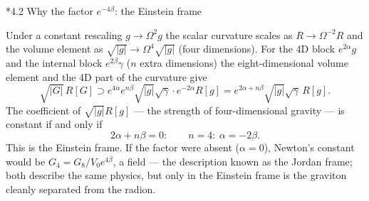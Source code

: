 \documentclass[10pt,a4paper]{article}
\makeatletter
\renewcommand\subsection{\@startsection{subsection}{2}{\z@}{-3.25ex\@plus -1ex \@minus -.2ex}{1.5ex \@plus .2ex}{\normalfont\large\bfseries\raggedright}}
\makeatother
\begin{document}
\subsection*{4.2 Why the factor \texorpdfstring{$e^{-4\beta}$}{e-4}: the Einstein frame}
Under a constant rescaling $g\to\Omega^2g$ the scalar curvature scales as $R\to\Omega^{-2}R$ and the volume element as $\sqrt{|g|}\to\Omega^4\sqrt{|g|}$ (four dimensions). For the 4D block $e^{2\alpha}g$ and the internal block $e^{2\beta}\gamma$ ($n$ extra dimensions) the eight-dimensional volume element and the 4D part of the curvature give
\begin{equation*}
\sqrt{|G|}\,R[G]\supset e^{4\alpha}e^{n\beta}\sqrt{|g|}\sqrt\gamma\cdot e^{-2\alpha}R[g]=e^{2\alpha+n\beta}\sqrt{|g|}\sqrt\gamma\,R[g] .
\end{equation*}
The coefficient of $\sqrt{|g|}R[g]$ — the strength of four-dimensional gravity — is constant if and only if
\begin{equation*}
2\alpha+n\beta=0:\qquad n=4:\ \alpha=-2\beta .
\end{equation*}
This is the Einstein frame. If the factor were absent ($\alpha=0$), Newton’s constant would be $G_4=G_8/V_0e^{4\beta}$, a field — the description known as the Jordan frame; both describe the same physics, but only in the Einstein frame is the graviton cleanly separated from the radion.
\end{document}
